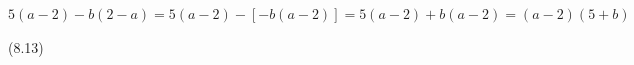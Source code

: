 {\begin{mdframed}[linewidth=4, leftmargin=40, rightmargin=40]
\begin{exercise}
\begin{enumerate}[noitemsep, label=\textbf{Step} \textbf{\arabic*}. ]
{\begin{equation}
      \end{equation}
    }{%
    \setlength{\mymathboxwidth}{\columnwidth}
      \addtolength{\mymathboxwidth}{-48pt}
    \par\vspace{12pt}\noindent\begin{minipage}{\columnwidth}
    \parbox[t]{\mymathboxwidth}{\large$
    5\left(a-2\right)-b\left(2-a\right)=5\left(a-2\right)-\left[-b\left(a-2\right)\right]=5\left(a-2\right)+b\left(a-2\right)=\left(a-2\right)\left(5+b\right)$}\hfill
    \parbox[t]{48pt}{\raggedleft 
    (8.13)}
    \end{minipage}\vspace{12pt}\par
    }%
          \end{enumerate}
    \end{exercise}
    \end{mdframed}
    }
    \noindent
\label{m39383*secfhsst!!!underscore!!!id923}
            \nopagebreak

